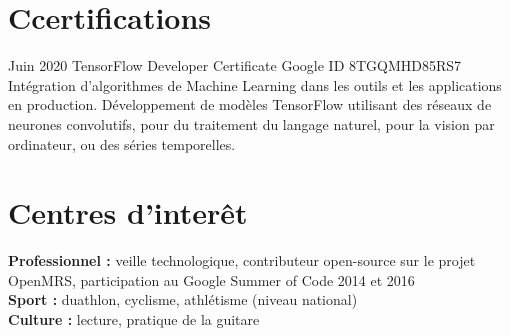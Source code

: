 \documentclass[]{cv-style}          %
\begin{document}

\section{Ccertifications}

\begin{entrylist}
\entry
{Juin 2020}
{TensorFlow Developer Certificate}
{Google}
{ID 8TGQMHD85RS7 \\ Intégration d'algorithmes de Machine Learning dans les outils et les applications en production. Développement de modèles TensorFlow utilisant des réseaux de neurones convolutifs, pour du traitement du langage naturel, pour la vision par ordinateur, ou des séries temporelles.}
\end{entrylist}


\section{Centres d'interêt}
  \vspace{-0.2cm}
  
\textbf{Professionnel :} veille technologique,  contributeur open-source sur le projet OpenMRS, participation au Google Summer of Code 2014 et 2016 \\
\textbf{Sport :} duathlon, cyclisme, athlétisme (niveau national) \\
\textbf{Culture :} lecture, pratique de la guitare
\end{document}
